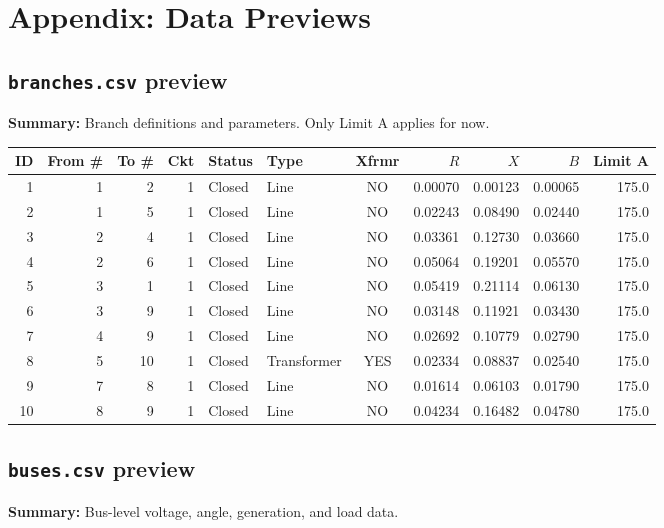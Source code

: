 \documentclass[11pt]{article}
\begin{document}
\appendix
\newpage
\section{Appendix: Data Previews}

\subsection{\texttt{branches.csv} preview}\label{app:branches-preview}
\textbf{Summary:} Branch definitions and parameters. Only Limit A applies for now.

\scriptsize
\begin{longtable}{@{}rrrrllcrrrr@{}}
\toprule
ID & From \# & To \# & Ckt & Status & Type & Xfrmr & $R$ & $X$ & $B$ & Limit A \\
\midrule
\endhead
1  & 1 & 2  & 1 & Closed & Line        & NO  & 0.00070 & 0.00123 & 0.00065 & 175.0 \\
2  & 1 & 5  & 1 & Closed & Line        & NO  & 0.02243 & 0.08490 & 0.02440 & 175.0 \\
3  & 2 & 4  & 1 & Closed & Line        & NO  & 0.03361 & 0.12730 & 0.03660 & 175.0 \\
4  & 2 & 6  & 1 & Closed & Line        & NO  & 0.05064 & 0.19201 & 0.05570 & 175.0 \\
5  & 3 & 1  & 1 & Closed & Line        & NO  & 0.05419 & 0.21114 & 0.06130 & 175.0 \\
6  & 3 & 9  & 1 & Closed & Line        & NO  & 0.03148 & 0.11921 & 0.03430 & 175.0 \\
7  & 4 & 9  & 1 & Closed & Line        & NO  & 0.02692 & 0.10779 & 0.02790 & 175.0 \\
8  & 5 & 10 & 1 & Closed & Transformer & YES & 0.02334 & 0.08837 & 0.02540 & 175.0 \\
9  & 7 & 8  & 1 & Closed & Line        & NO  & 0.01614 & 0.06103 & 0.01790 & 175.0 \\
10 & 8 & 9  & 1 & Closed & Line        & NO  & 0.04234 & 0.16482 & 0.04780 & 175.0 \\
\bottomrule
\end{longtable}
\normalsize

\subsection{\texttt{buses.csv} preview}
\textbf{Summary:} Bus-level voltage, angle, generation, and load data.
\end{document}
